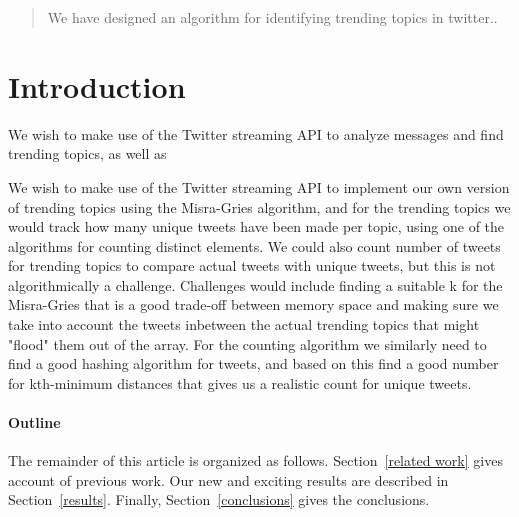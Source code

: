 \documentclass[12pt]{article}
\begin{document}
\maketitle

\begin{abstract}
We have designed an algorithm for identifying trending topics in twitter..
\end{abstract}

\section{Introduction}
We wish to make use of the Twitter streaming API to analyze messages and find trending topics, as well as

We wish to make use of the Twitter streaming API to implement our own version of trending topics using the Misra-Gries algorithm, and for the trending topics we would track how many unique tweets have been made per topic, using one of the algorithms for counting distinct elements. We could also count number of tweets for trending topics to compare actual tweets with unique tweets, but this is not algorithmically a challenge.
\newline\newline
Challenges would include finding a suitable k for the Misra-Gries that is a good trade-off between memory space and making sure we take into account the tweets inbetween the actual trending topics that might "flood" them out of the array.
\newline\newline
For the counting algorithm we similarly need to find a good hashing algorithm for tweets, and based on this find a good number for kth-minimum distances that gives us a realistic count for unique tweets.

\paragraph{Outline}
The remainder of this article is organized as follows.
Section~\ref{related work} gives account of previous work.
Our new and exciting results are described in Section~\ref{results}.
Finally, Section~\ref{conclusions} gives the conclusions.
\end{document}
